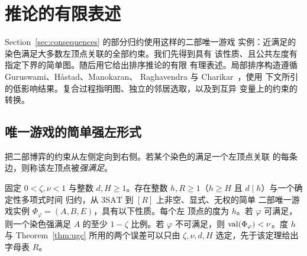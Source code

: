 \section{推论的有限表述}
\label{app:finite-consequences}

Section~\ref{sec:consequences} 的部分归约使用这样的二部唯一游戏
实例：近满足的染色满足大多数左顶点关联的全部约束。我们先得到具有
该性质、且公共左度有指定下界的简单图。随后用它给出排序推论的有限
有理表述。局部排序构造遵循 Guruswami、H\aa stad、Manokaran、
Raghavendra 与 Charikar~\cite{GuruswamiEtAl2011OrderingCSP}，使用
下文所引的低影响结果。复合过程指明图、独立的邻居选取，以及到互异
变量上的约束的转换。

\subsection{唯一游戏的简单强左形式}

把二部博弈的约束从左侧定向到右侧。若某个染色的满足一个左顶点关联
的每条边，则称该左顶点被\emph{强满足}。

\begin{lemma}[简单强左博弈]\label{lem:simple-strong-left}
固定 \(0<\zeta,\nu<1\) 与整数 \(d,H\ge1\)。存在整数
\(h,R\ge1\)（\(h\ge H\) 且 \(d\mid h\)）与一个确定性多项式时间
归约，从 \(\mathrm{3SAT}\) 到 \([R]\) 上非空、显式、无权的简单
二部唯一游戏实例 \(\Phi_\varphi=(A,B,E)\)，具有以下性质。每个左
顶点的度为 \(h\)。若 \(\varphi\) 可满足，则一个染色强满足 \(A\)
的至少 \(1-\zeta\) 比例。若 \(\varphi\) 不可满足，则
\(\operatorname{val}(\Phi_\varphi)<\nu\)。度 \(h\) 与 Theorem~\ref{thm:ugc}
所用的两个误差可以只由 \(\zeta,\nu,d,H\) 选定，先于该定理给出
字母表 \(R\)。
\end{lemma}

